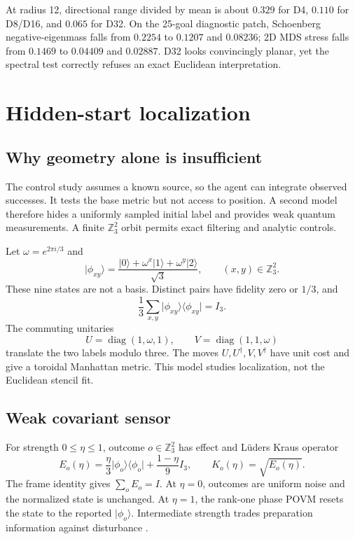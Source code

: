 \documentclass[11pt]{article}
\theoremstyle{definition}\newtheorem{definition}[theorem]{Definition}
\theoremstyle{remark}\newtheorem{remark}[theorem]{Remark}
\newcommand{\Z}{\mathbb Z}
\newcommand{\ket}[1]{\lvert #1\rangle}
\newcommand{\proj}[1]{\lvert #1\rangle\!\langle #1\rvert}
\begin{document}
At radius 12, directional range divided by mean is about \(0.329\) for D4,
\(0.110\) for D8/D16, and \(0.065\) for D32. On the 25-goal diagnostic patch,
Schoenberg negative-eigenmass falls from \(0.2254\) to \(0.1207\) and
\(0.08236\); 2D MDS stress falls from \(0.1469\) to \(0.04409\) and
\(0.02887\). D32 looks convincingly planar, yet the spectral test correctly
refuses an exact Euclidean interpretation.

\section{Hidden-start localization}
\label{sec:localization-theory}

\subsection{Why geometry alone is insufficient}

The control study assumes a known source, so the agent can integrate observed
successes. It tests the base metric but not access to position. A second model
therefore hides a uniformly sampled initial label and provides weak quantum
measurements. A finite \(\Z_3^2\) orbit permits exact filtering and analytic
controls.

Let \(\omega=e^{2\pi i/3}\) and
\begin{equation}
\ket{\phi_{xy}}=\frac{\ket0+\omega^x\ket1+\omega^y\ket2}{\sqrt3},
\qquad (x,y)\in\Z_3^2.
\label{eq:phase-grid}
\end{equation}
These nine states are not a basis. Distinct pairs have fidelity zero or
\(1/3\), and
\begin{equation}
\frac13\sum_{x,y}\proj{\phi_{xy}}=I_3.
\label{eq:frame}
\end{equation}
The commuting unitaries
\[
U=\operatorname{diag}(1,\omega,1),\qquad
V=\operatorname{diag}(1,1,\omega)
\]
translate the two labels modulo three. The moves
\(U,U^\dagger,V,V^\dagger\) have unit cost and give a toroidal Manhattan
metric. This model studies localization, not the Euclidean stencil fit.

\subsection{Weak covariant sensor}

For strength \(0\le\eta\le1\), outcome \(o\in\Z_3^2\) has effect and Lüders
Kraus operator
\begin{equation}
E_o(\eta)=\frac{\eta}{3}\proj{\phi_o}
+\frac{1-\eta}{9}I_3,\qquad K_o(\eta)=\sqrt{E_o(\eta)}.
\label{eq:weak-povm}
\end{equation}
The frame identity gives \(\sum_oE_o=I\). At \(\eta=0\), outcomes are uniform
noise and the normalized state is unchanged. At \(\eta=1\), the rank-one
phase POVM resets the state to the reported \(\ket{\phi_o}\). Intermediate
strength trades preparation information against disturbance
\cite{holevo2011,helstrom1976,wiseman2010}.
\end{document}

